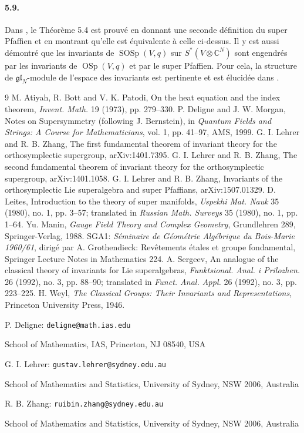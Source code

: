 \documentclass[11pt]{article}
\newcommand{\C}{\mathbb C}
\newcommand{\OSp}{\operatorname{OSp}}
\newcommand{\SOSp}{\operatorname{SOSp}}
\begin{document}
\paragraph{5.9.}
Dans \cite{LZ15}, le Théorème 5.4 est prouvé en donnant une seconde définition du super Pfaffien et en montrant qu'elle est équivalente à celle ci-dessus. Il y est aussi démontré que les invariants de $\SOSp(V,q)$ sur $S^*(V\otimes\C^N)$ sont engendrés par les invariants de $\OSp(V,q)$ et par le super Pfaffien. Pour cela, la structure de $\mathfrak{gl}_N$-module de l'espace des invariants est pertinente et est élucidée dans \cite{LZ15}.

\begin{thebibliography}{9}
 M. Atiyah, R. Bott and V. K. Patodi, On the heat equation and the index theorem, \emph{Invent. Math.} 19 (1973), pp. 279--330.
 P. Deligne and J. W. Morgan, Notes on Supersymmetry (following J. Bernstein), in \emph{Quantum Fields and Strings: A Course for Mathematicians}, vol. 1, pp. 41--97, AMS, 1999.
 G. I. Lehrer and R. B. Zhang, The first fundamental theorem of invariant theory for the orthosymplectic supergroup, arXiv:1401.7395.
 G. I. Lehrer and R. B. Zhang, The second fundamental theorem of invariant theory for the orthosymplectic supergroup, arXiv:1401.1058.
 G. I. Lehrer and R. B. Zhang, Invariants of the orthosymplectic Lie superalgebra and super Pfaffians, arXiv:1507.01329.
 D. Leites, Introduction to the theory of super manifolds, \emph{Uspekhi Mat. Nauk} 35 (1980), no. 1, pp. 3--57; translated in \emph{Russian Math. Surveys} 35 (1980), no. 1, pp. 1--64.
 Yu. Manin, \emph{Gauge Field Theory and Complex Geometry}, Grundlehren 289, Springer-Verlag, 1988.
 SGA1: \emph{Séminaire de Géométrie Algébrique du Bois-Marie 1960/61}, dirigé par A. Grothendieck: Revêtements étales et groupe fondamental, Springer Lecture Notes in Mathematics 224.
 A. Sergeev, An analogue of the classical theory of invariants for Lie superalgebras, \emph{Funktsional. Anal. i Prilozhen.} 26 (1992), no. 3, pp. 88--90; translated in \emph{Funct. Anal. Appl.} 26 (1992), no. 3, pp. 223--225.
 H. Weyl, \emph{The Classical Groups: Their Invariants and Representations}, Princeton University Press, 1946.
\end{thebibliography}

\vspace{1em}
\noindent P. Deligne: \texttt{deligne@math.ias.edu}\par
\noindent School of Mathematics, IAS, Princeton, NJ 08540, USA

\medskip
\noindent G. I. Lehrer: \texttt{gustav.lehrer@sydney.edu.au}\par
\noindent School of Mathematics and Statistics, University of Sydney, NSW 2006, Australia

\medskip
\noindent R. B. Zhang: \texttt{ruibin.zhang@sydney.edu.au}\par
\noindent School of Mathematics and Statistics, University of Sydney, NSW 2006, Australia
\end{document}
